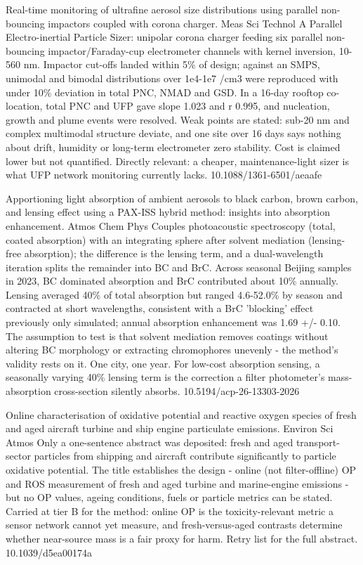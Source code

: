 \documentclass[10pt]{article}
\begin{document}

{Real-time monitoring of ultrafine aerosol size distributions using parallel non-bouncing impactors coupled with corona charger.}
{Meas Sci Technol}
{A Parallel Electro-inertial Particle Sizer: unipolar corona charger feeding six parallel non-bouncing impactor/Faraday-cup electrometer channels with kernel inversion, 10-560 nm. Impactor cut-offs landed within 5\% of design; against an SMPS, unimodal and bimodal distributions over 1e4-1e7 /cm3 were reproduced with under 10\% deviation in total PNC, NMAD and GSD. In a 16-day rooftop co-location, total PNC and UFP gave slope 1.023 and r 0.995, and nucleation, growth and plume events were resolved. Weak points are stated: sub-20 nm and complex multimodal structure deviate, and one site over 16 days says nothing about drift, humidity or long-term electrometer zero stability. Cost is claimed lower but not quantified. Directly relevant: a cheaper, maintenance-light sizer is what UFP network monitoring currently lacks.}
{10.1088/1361-6501/aeaafe}

{Apportioning light absorption of ambient aerosols to black carbon, brown carbon, and lensing effect using a PAX-ISS hybrid method: insights into absorption enhancement.}
{Atmos Chem Phys}
{Couples photoacoustic spectroscopy (total, coated absorption) with an integrating sphere after solvent mediation (lensing-free absorption); the difference is the lensing term, and a dual-wavelength iteration splits the remainder into BC and BrC. Across seasonal Beijing samples in 2023, BC dominated absorption and BrC contributed about 10\% annually. Lensing averaged 40\% of total absorption but ranged 4.6-52.0\% by season and contracted at short wavelengths, consistent with a BrC 'blocking' effect previously only simulated; annual absorption enhancement was 1.69 +/- 0.10. The assumption to test is that solvent mediation removes coatings without altering BC morphology or extracting chromophores unevenly - the method's validity rests on it. One city, one year. For low-cost absorption sensing, a seasonally varying 40\% lensing term is the correction a filter photometer's mass-absorption cross-section silently absorbs.}
{10.5194/acp-26-13303-2026}

{Online characterisation of oxidative potential and reactive oxygen species of fresh and aged aircraft turbine and ship engine particulate emissions.}
{Environ Sci Atmos}
{Only a one-sentence abstract was deposited: fresh and aged transport-sector particles from shipping and aircraft contribute significantly to particle oxidative potential. The title establishes the design - online (not filter-offline) OP and ROS measurement of fresh and aged turbine and marine-engine emissions - but no OP values, ageing conditions, fuels or particle metrics can be stated. Carried at tier B for the method: online OP is the toxicity-relevant metric a sensor network cannot yet measure, and fresh-versus-aged contrasts determine whether near-source mass is a fair proxy for harm. Retry list for the full abstract.}
{10.1039/d5ea00174a}
\end{document}

